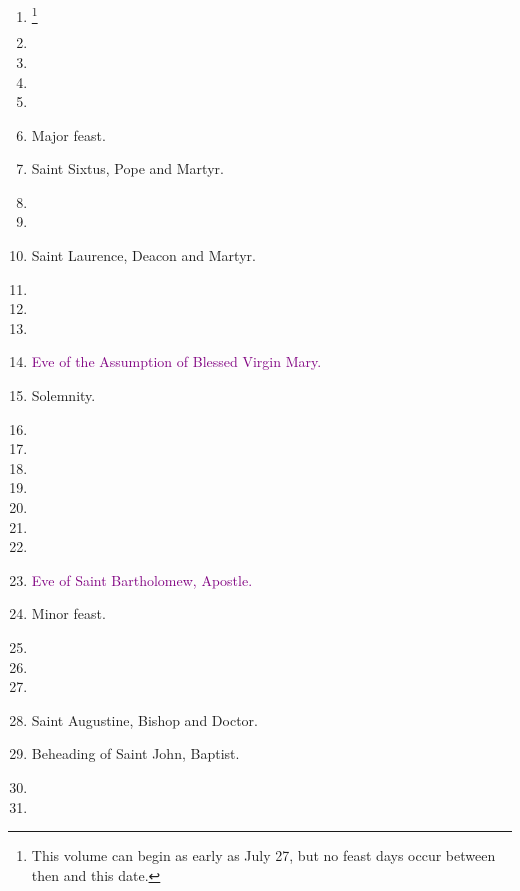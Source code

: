 		\begin{enumerate}
			\item \footnote{This volume can begin as early as July 27, but no feast days occur between then and this date.} %
			\item %
			\item %
			\item %
			\item %
			\item {} Major feast.
			\item Saint Sixtus, Pope and Martyr. 
			\item %
			\item %
			\item Saint Laurence, Deacon and Martyr. 
			\item %
			\item %
			\item %
			\item \textcolor{purple}{Eve of the Assumption of Blessed Virgin Mary.}
			\item {} Solemnity.
			\item %
			\item %
			\item %
			\item %
			\item %
			\item %
			\item %
			\item \textcolor{purple}{Eve of Saint Bartholomew, Apostle.}
			\item {} Minor feast.
			\item %
			\item %
			\item %
			\item Saint Augustine, Bishop and Doctor. 
			\item Beheading of Saint John, Baptist. 
			\item %
			\item %
		\end{enumerate}

	
